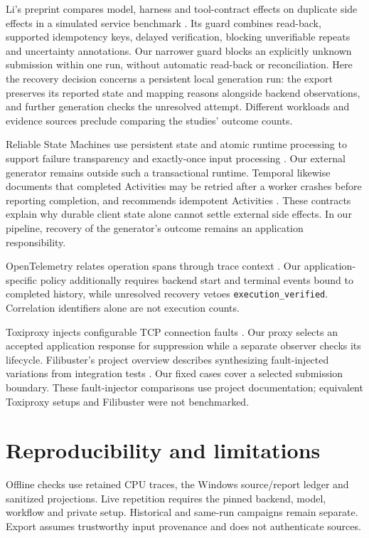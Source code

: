 \documentclass[conference,letterpaper,10pt]{IEEEtran}
\begin{document}
Li's preprint compares model, harness and tool-contract effects on duplicate
side effects in a simulated service benchmark \cite{li2026exactlyonce}. Its
guard combines read-back, supported idempotency keys, delayed verification,
blocking unverifiable repeats and uncertainty annotations. Our narrower guard
blocks an explicitly unknown submission within one run, without automatic
read-back or reconciliation. Here the recovery decision concerns a persistent
local generation run: the export preserves its reported state and mapping
reasons alongside backend observations, and further generation checks the
unresolved attempt. Different
workloads and evidence sources preclude comparing the studies' outcome counts.

Reliable State Machines use persistent state and atomic runtime processing
to support failure transparency and exactly-once input processing
\cite{rsm2019}. Our external generator remains outside such a transactional
runtime. Temporal likewise documents that completed Activities may be retried
after a worker crashes before reporting completion, and recommends idempotent
Activities \cite{temporal}. These contracts explain why durable client state
alone cannot settle external side effects. In our pipeline, recovery of the
generator's outcome remains an application responsibility.

OpenTelemetry relates operation spans through trace context \cite{otel}.
Our application-specific policy additionally requires backend start and terminal
events bound to completed history, while unresolved recovery vetoes
\texttt{execution\_verified}. Correlation identifiers alone are not execution counts.

Toxiproxy injects configurable TCP connection faults \cite{toxiproxy}. Our
proxy selects an accepted application response for suppression while a separate
observer checks its lifecycle. Filibuster's project overview describes
synthesizing fault-injected variations from integration tests \cite{filibuster}.
Our fixed cases cover a selected submission boundary. These fault-injector
comparisons use project documentation; equivalent Toxiproxy setups and
Filibuster were not benchmarked.

\section{Reproducibility and limitations}

Offline checks use retained CPU traces, the Windows source/report ledger and
sanitized projections. Live repetition requires the pinned backend, model,
workflow and private setup. Historical and same-run campaigns remain separate.
Export assumes trustworthy input provenance and does not authenticate sources.
\end{document}
